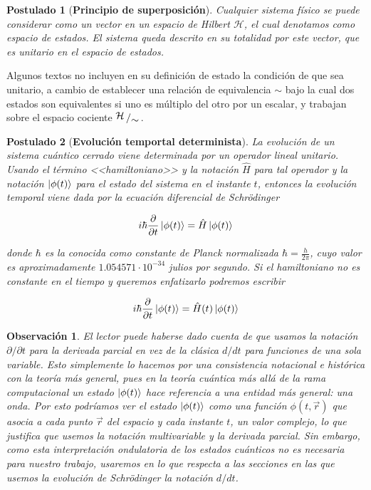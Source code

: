 \documentclass[11pt, spanish]{report}
\newcommand{\bigslant}[2]{{\raisebox{.2em}{$#1$}\left/\raisebox{-.2em}{$#2$}\right.}}
\numberwithin{equation}{section}
\newtheorem{postu}{Postulado}
\newtheorem{obs}[defin]{Observación}
\numberwithin{defin}{section}
\begin{document}
\begin{appendices}
\begin{postu}[\textbf{Principio de superposición}]\label{post:hilbert} Cualquier sistema físico se puede considerar como un vector en un espacio de Hilbert $\mathcal{H}$, el cual denotamos como \emph{espacio de estados}. El sistema queda descrito en su totalidad por este vector, que es unitario en el espacio de estados.
\end{postu}

Algunos textos no incluyen en su definición de estado la condición de que sea unitario, a cambio de establecer una relación de equivalencia $\sim$ bajo la cual dos estados son equivalentes si uno es múltiplo del otro por un escalar, y trabajan sobre el espacio cociente $\bigslant{\mathcal{H}}{\sim}$.

\begin{postu}[\textbf{Evolución temportal determinista}]\label{post:evol}La evolución de un sistema cuántico cerrado viene determinada por un operador lineal unitario. Usando el término <<hamiltoniano>> y la notación $\hat{H}$ para tal operador y la notación $\ket{\phi(t)}$ para el estado del sistema en el instante $t$, entonces la evolución temporal viene dada por la ecuación diferencial de Schrödinger

\begin{equation}
i\hbar\frac{\partial}{\partial t}\ket{\phi(t)}=\hat{H}\ket{\phi(t)}
\end{equation}

donde $\hbar$ es la conocida como constante de Planck normalizada $\hbar=\frac{h}{2\pi}$, cuyo valor es aproximadamente $1.054571\cdot 10^{-34}$ julios por segundo. Si el hamiltoniano no es constante en el tiempo y queremos enfatizarlo podremos escribir

\begin{equation}
i\hbar\frac{\partial}{\partial t}\ket{\phi(t)}=\hat{H}(t)\ket{\phi(t)}
\end{equation}

\end{postu}

\begin{obs}
El lector puede haberse dado cuenta de que usamos la notación $\partial/\partial t$ para la derivada parcial en vez de la clásica  $d/dt$ para funciones de una sola variable. Esto simplemente lo hacemos por una consistencia notacional e histórica con la teoría más general, pues en la teoría cuántica más allá de la rama computacional un estado $\ket{\phi(t)}$ hace referencia a una entidad más general: una onda. Por esto podríamos ver el estado $\ket{\phi(t)}$ como una función $\phi(t,\vec{r})$ que asocia a cada punto $\vec{r}$ del espacio y cada instante $t$, un valor complejo, lo que justifica que usemos la notación multivariable y la derivada parcial. Sin embargo, como esta interpretación ondulatoria de los estados cuánticos no es necesaria para nuestro trabajo, usaremos en lo que respecta a las secciones en las que usemos la evolución de Schrödinger la notación $d/dt$.
\end{obs}


\end{appendices}
\end{document}
